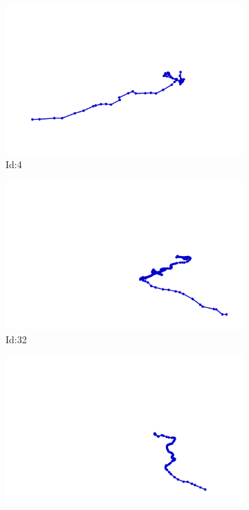\documentclass[12pt,twoside]{report}
\begin{document}
\begin{figure}
\centering
\begin{subfigure}[b]{0.20\textwidth}
\centering
\includegraphics[width=\textwidth]{../trajectories/4.png}
\caption{Id:4}
\end{subfigure}
\begin{subfigure}[b]{0.20\textwidth}
\centering
\includegraphics[width=\textwidth]{../trajectories/32.png}
\caption{Id:32}
\end{subfigure}
\begin{subfigure}[b]{0.20\textwidth}
\centering
\includegraphics[width=\textwidth]{../trajectories/60.png}

\end{subfigure}
\end{figure}
\end{document}
